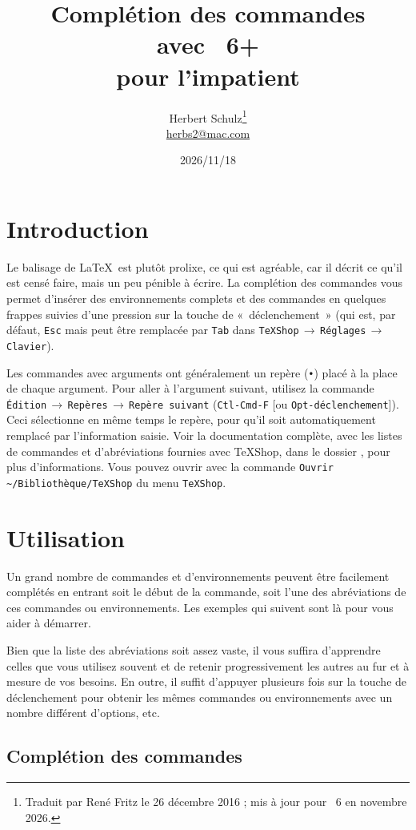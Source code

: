 \documentclass[11pt]{article}
\title{Complétion des commandes\\ avec \TS\ 6+\\ pour l’impatient}
\author{Herbert Schulz\thanks{Traduit par René Fritz le 26 décembre 2016 ; mis à jour pour \TS\ 6 en novembre 2026.}\\\small\href{mailto:herbs2@mac.com}{herbs2@mac.com}}
\date{2026/11/18}
\newcommand{\mnu}[1]{\texttt{#1}}
\newcommand{\cmd}[1]{\texttt{#1}}
\newcommand{\To}{\,\(\to\)\,}
\newcommand{\TS}{\textsf{\TeX Shop}}
\begin{document}
\maketitle
\thispagestyle{empty}

\section*{Introduction}

Le balisage de \LaTeX\ est plutôt prolixe, ce qui est agréable, car il décrit ce qu’il est censé faire, mais un peu pénible à écrire. La complétion des commandes vous permet d’insérer des environnements complets et des commandes en quelques frappes suivies d’une pression sur la touche de «~déclenchement~» (qui est, par défaut, \cmd{Esc} mais peut être remplacée par \cmd{Tab} dans \mnu{TeXShop}\To\mnu{Réglages}\To\mnu{Clavier}).

Les commandes avec arguments ont généralement un repère (\texttt{•}) placé à la place de chaque argument. Pour aller à l’argument suivant, utilisez la commande \mnu{Édition}\To\mnu{Repères}\To\mnu{Repère suivant} (\cmd{Ctl-Cmd-F} [ou \cmd{Opt-déclenchement}]). Ceci sélectionne en même temps le repère, pour qu’il soit automatiquement remplacé par l’information saisie. Voir la documentation complète, avec les listes de commandes et d’abréviations fournies avec \TS, dans le dossier , pour plus d’informations. Vous pouvez ouvrir  avec la commande \mnu{Ouvrir \textasciitilde/Bibliothèque/TeXShop} du menu \mnu{TeXShop}.

\section*{Utilisation}

Un grand nombre de commandes et d’environnements peuvent être facilement complétés en entrant soit le début de la commande, soit l’une des abréviations de ces commandes ou environnements. Les exemples qui suivent sont là pour vous aider à démarrer.

Bien que la liste des abréviations soit assez vaste, il vous suffira d’apprendre celles que vous utilisez souvent et de retenir progressivement les autres au fur et à mesure de vos besoins. En outre, il suffit d’appuyer plusieurs fois sur la touche de déclenchement pour obtenir les mêmes commandes ou environnements avec un nombre différent d’options, etc.

\subsection*{Complétion des commandes}
\end{document}
